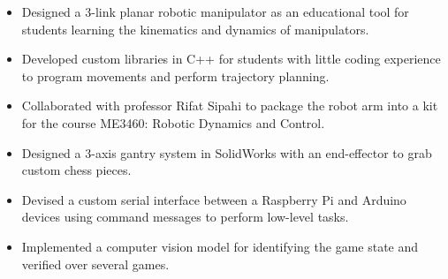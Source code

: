 \documentclass[10pt,a4paper,ragged2e,withhyper]{altacv}
\begin{document}
    \begin{itemize}
        \item Designed a 3-link planar robotic manipulator as an educational tool for students learning the kinematics and dynamics of manipulators.
        \item Developed custom libraries in C++ for students with little coding experience to program movements and perform trajectory planning.
        \item Collaborated with professor Rifat Sipahi to package the robot arm into a kit for the course ME3460: Robotic Dynamics and Control.
    \end{itemize}
    \begin{itemize}
        \item Designed a 3-axis gantry system in SolidWorks with an end-effector to grab custom chess pieces.
        \item Devised a custom serial interface between a Raspberry Pi and Arduino devices using command messages to perform low-level tasks.
        \item Implemented a computer vision model for identifying the game state and verified over several games.
    \end{itemize}
    \vspace{-1.55em}
\end{document}
